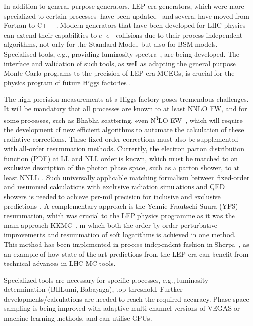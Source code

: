 \documentclass[10pt,a4paper]{article}
\begin{document}
In addition to general purpose generators, LEP-era generators, which were more
specialized to certain processes, have been
updated~\cite{Jadach:1999vf,CarloniCalame:2003yt,Jadach:1991by,Denner:2000bj}
and several have moved from Fortran to C++~\cite{Jadach:2022mbe}. Modern
generators that have been developed for LHC physics can extend their
capabilities to $e^+e^-$ collisions due to their process independent algorithms,
not only for the Standard Model, but also for BSM models. Specialised tools,
e.g., providing luminosity spectra~\cite{Ohl:1996fi}, are being developed. The
interface and validation of such tools, as well as adapting the general purpose
Monte Carlo programs to the precision of LEP era MCEGs, is crucial for the
physics program of future Higgs factories  .

The high precision measurements at a Higgs factory poses tremendous challenges.
It will be mandatory that all processes are known to at least NNLO EW, and for
some processes, such as Bhabha scattering, even N\textsuperscript{3}LO
EW~\cite{ECFAHiggsStudy:2025}, which will require the development of new
efficient algorithms to automate the calculation of these radiative corrections.
These fixed-order corrections must also be supplemented with all-order
resummation methods. Currently, the electron parton distribution function (PDF)
at LL and NLL order is known, which must be matched to an exclusive description
of the photon phase space, such as a parton shower, to at least
NNLL~\cite{ECFAHiggsStudy:2025,Bertone:2019hks,Frixione:2019lga}. Such
universally applicable matching formalism between fixed-order and resummed
calculations with exclusive radiation simulations and QED showers is needed to
achieve per-mil precision for inclusive and exclusive
predictions~\cite{Frixione:2022ofv}. A complementary approach is the
Yennie-Frautschi-Suura (YFS) resummation, which was crucial to the LEP physics
programme as it was the main approach KKMC~\cite{Jadach:1999vf}, in which both
the order-by-order perturbative improvements and resummation of soft logarithms
is achieved in one method. This method has been implemented in process
independent fashion in Sherpa~\cite{Krauss:2022ajk}, as an example of how state
of the art predictions from the LEP era can benefit from technical advances in
LHC MC tools.

Specialized tools are necessary for specific processes, e.g., luminosity
determination (BHLumi, Babayaga), top threshold. Further
developments/calculations are needed to reach the required accuracy. Phase-space
sampling is being improved with adaptive multi-channel versions of VEGAS or
machine-learning methods, and can utilise GPUs.
\end{document}
